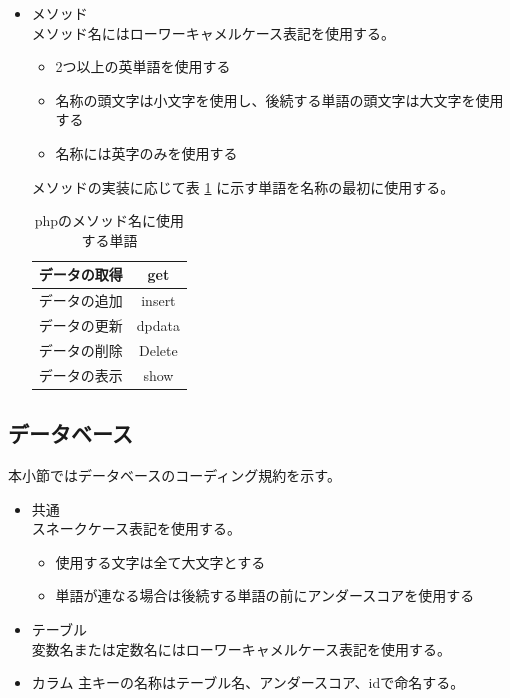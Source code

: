 \documentclass[a4j]{jarticle}
\begin{document}
\begin{itemize}
	\item メソッド\\
		メソッド名にはローワーキャメルケース表記を使用する。
	\begin{itemize}
		\item 2つ以上の英単語を使用する
		\item 名称の頭文字は小文字を使用し、後続する単語の頭文字は大文字を使用する
		\item 名称には英字のみを使用する
	\end{itemize}
		メソッドの実装に応じて表 \ref {tab:ophp} に示す単語を名称の最初に使用する。
				\begin{table}[H]
			\caption{phpのメソッド名に使用する単語}
			\label{tab:ophp}
			\begin{center}
			\begin{tabular}{|c|c|}
			\hline
			データの取得 & get\\\hline
			データの追加 & insert\\\hline
			データの更新  & dpdata\\\hline
			データの削除  & Delete\\\hline
			データの表示 &show\\\hline
			\end{tabular}
			\end{center}
			\end{table}
\end{itemize}
\subsection{データベース}
本小節ではデータベースのコーディング規約を示す。
	\begin{itemize}
	\item 共通\\
		スネークケース表記を使用する。
	\begin{itemize}
		\item 使用する文字は全て大文字とする
		\item 単語が連なる場合は後続する単語の前にアンダースコアを使用する
	\end{itemize}
	\item テーブル\\
		変数名または定数名にはローワーキャメルケース表記を使用する。
	\item カラム
		主キーの名称はテーブル名、アンダースコア、idで命名する。
\end{itemize}
\end{document}
